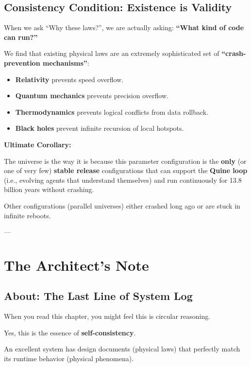\documentclass[11pt,a4paper,twoside]{book}
\begin{document}
\subsection{Consistency Condition: Existence is Validity}

When we ask ``Why these laws?'', we are actually asking: \textbf{``What kind of code can run?''}

We find that existing physical laws are an extremely sophisticated set of \textbf{``crash-prevention mechanisms''}:

\begin{itemize}
\item \textbf{Relativity} prevents speed overflow.

\item \textbf{Quantum mechanics} prevents precision overflow.

\item \textbf{Thermodynamics} prevents logical conflicts from data rollback.

\item \textbf{Black holes} prevent infinite recursion of local hotspots.
\end{itemize}

\textbf{Ultimate Corollary:}

The universe is the way it is because this parameter configuration is the \textbf{only} (or one of very few) \textbf{stable release} configurations that can support the \textbf{Quine loop} (i.e., evolving agents that understand themselves) and run continuously for 13.8 billion years without crashing.

Other configurations (parallel universes) either crashed long ago or are stuck in infinite reboots.

---

\section{The Architect's Note}

\subsection{About: The Last Line of System Log}

When you read this chapter, you might feel this is circular reasoning.

Yes, this is the essence of \textbf{self-consistency}.

An excellent system has design documents (physical laws) that perfectly match its runtime behavior (physical phenomena).
\end{document}
